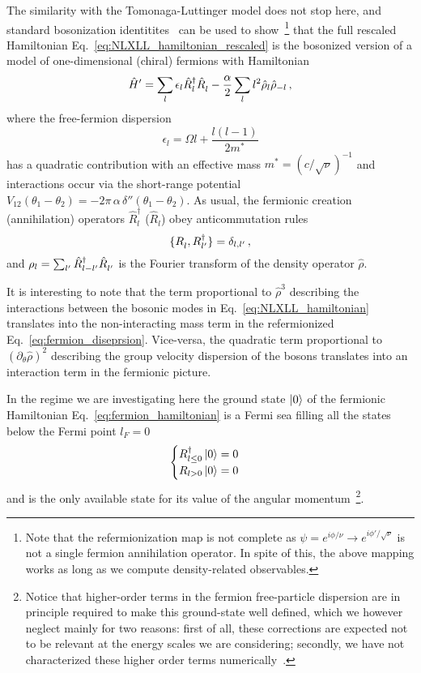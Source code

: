\documentclass[twocolumn,pra,superscriptaddress,noshowpacs]{revtex4}
\begin{document}
The similarity with the Tomonaga-Luttinger model does not stop here, and standard bosonization identitites~\cite{Giamarchi_QP1D_2004} can be used to show~\footnote{Note that the refermionization map is not complete as $\psi = e^{i\phi/\nu}\rightarrow e^{i\phi'/\sqrt{\nu}}$ is not a single fermion annihilation operator. In spite of this, the above mapping works as long as we compute density-related observables.} that the full rescaled Hamiltonian Eq.~\eqref{eq:NLXLL_hamiltonian_rescaled} is the bosonized version of a model of one-dimensional (chiral) fermions with Hamiltonian
\begin{equation}
    \label{eq:fermion_hamiltonian}
	\hat{H}'=\sum_l \epsilon_l \hat R^\dagger_l \hat R^{\vphantom{\dagger}}_l - \frac{\alpha}{2}\sum_l l^2 \hat{\rho}_l\hat{\rho}_{-l}\,,
\end{equation}
where the free-fermion dispersion
\begin{equation}
    \label{eq:fermion_diseprsion}
    \epsilon_l = \Omega l + \frac{l(l-1)}{2m^*}
\end{equation}
has a quadratic contribution with an effective mass $m^*=(c/\sqrt{\nu})^{-1}$ and interactions occur via the short-range potential $V_{12}(\theta_1-\theta_2)=-2\pi\,\alpha\, \delta''(\theta_1-\theta_2)$. 
As usual, the fermionic creation (annihilation) operators $\hat R_l^\dagger$ ($\hat R_l$) obey anticommutation rules
\begin{equation}
    \{R^{\vphantom{\dagger}}_l,R^\dagger_{l'}\}=\delta_{l,l'}\,,
\end{equation}
and $\rho_l=\sum_{l'} \hat R^\dagger_{l-l'} \hat R^{\vphantom{\dagger}}_{l'}$ is the Fourier transform of the density operator $\hat\rho$.

It is interesting to note that the term proportional to $\hat\rho^3$ describing the interactions between the bosonic modes in Eq.~\eqref{eq:NLXLL_hamiltonian} translates into the non-interacting mass term in the refermionized Eq.~\eqref{eq:fermion_diseprsion}. 
Vice-versa, the quadratic term proportional to $(\partial_\theta\hat\rho)^2$ describing the group velocity dispersion of the bosons translates into an interaction term in the fermionic picture. 

In the regime we are investigating here the ground state $\ket{0}$ of the fermionic Hamiltonian Eq.~\eqref{eq:fermion_hamiltonian} is a Fermi sea filling all the states below the Fermi point $l_F=0$
\begin{equation}
\begin{cases}
R_{l\leq0}^\dagger\ket{0}=0\\
R_{l>0}\ket{0}=0
\end{cases}
\end{equation} 
and is the only available state for its value of the angular momentum~\footnote{Notice that higher-order terms in the fermion free-particle dispersion are in principle required to make this ground-state well defined, which we however neglect mainly for two reasons: first of all, these corrections are expected not to be relevant at the energy scales we are considering; secondly, we have not characterized these higher order terms numerically~\cite{Nardin_PRA_2023}.}.
\end{document}
